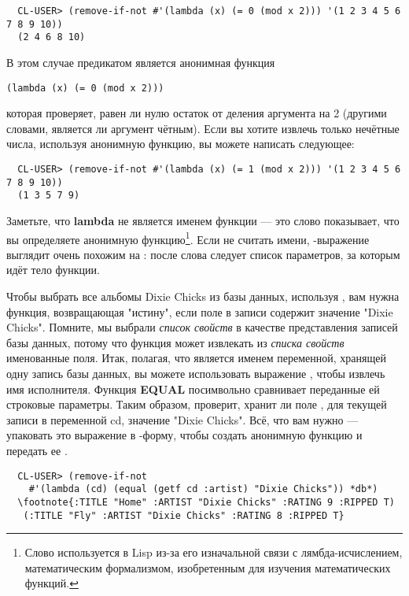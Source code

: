 \begin{verbatim}
  CL-USER> (remove-if-not #'(lambda (x) (= 0 (mod x 2))) '(1 2 3 4 5 6 7 8 9 10))
  (2 4 6 8 10)
\end{verbatim}

В этом случае предикатом является анонимная функция

\begin{lstlisting}
(lambda (x) (= 0 (mod x 2)))
\end{lstlisting}

которая проверяет, равен ли нулю остаток от деления аргумента на 2 (другими словами,
является ли аргумент чётным). Если вы хотите извлечь только нечётные числа, используя
анонимную функцию, вы можете написать следующее:

\begin{verbatim}
  CL-USER> (remove-if-not #'(lambda (x) (= 1 (mod x 2))) '(1 2 3 4 5 6 7 8 9 10))
  (1 3 5 7 9)
\end{verbatim}

Заметьте, что \textbf{lambda} не является именем функции --- это слово показывает, что вы
определяете анонимную функцию\footnote{Слово  используется в Lisp из-за его
  изначальной связи с лямбда-исчислением, математическим формализмом, изобретенным для
  изучения математических функций.}. Если не считать имени, -выражение
выглядит очень похожим на : после слова  следует список
параметров, за которым идёт тело функции.

Чтобы выбрать все альбомы Dixie Chicks из базы данных, используя , вам
нужна функция, возвращающая "истину", если поле в записи  содержит значение
"Dixie Chicks". Помните, мы выбрали \textit{список свойств} в качестве представления
записей базы данных, потому что функция  может извлекать из \textit{списка
  свойств} именованные поля. Итак, полагая, что  является именем переменной,
хранящей одну запись базы данных, вы можете использовать выражение , чтобы извлечь имя исполнителя. Функция \textbf{EQUAL} посимвольно сравнивает
переданные ей строковые параметры. Таким образом,  проверит, хранит ли поле , для текущей записи в переменной cd,
значение "Dixie Chicks". Всё, что вам нужно --- упаковать это выражение в
-форму, чтобы создать анонимную функцию и передать ее .

\begin{verbatim}
  CL-USER> (remove-if-not
    #'(lambda (cd) (equal (getf cd :artist) "Dixie Chicks")) *db*)
  \footnote{:TITLE "Home" :ARTIST "Dixie Chicks" :RATING 9 :RIPPED T)
   (:TITLE "Fly" :ARTIST "Dixie Chicks" :RATING 8 :RIPPED T}
\end{verbatim}

